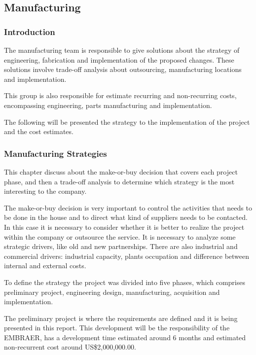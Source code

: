
\subsection{Manufacturing}

\subsubsection{Introduction}

The manufacturing team is responsible to give solutions about the strategy of engineering, fabrication and implementation of the proposed changes. These solutions involve trade-off analysis about outsourcing, manufacturing 
locations and implementation. 

This group is also responsible for estimate recurring and non-recurring costs, encompassing engineering, parts manufacturing and implementation.

The following will be presented the strategy to the implementation of the project and the cost estimates.

\subsubsection{Manufacturing Strategies}

This chapter discuss about the make-or-buy decision that covers each project phase, and then a trade-off analysis to determine which strategy is the most interesting to the company.

The make-or-buy decision is very important to control the activities that needs to be done in the house and to direct what kind of suppliers needs to be contacted. In this case it is necessary to consider whether it is 
better to realize the project within the company or outsource the service. It is necessary to analyze some strategic drivers, like old and new partnerships. There are also industrial and commercial drivers: industrial 
capacity, plants occupation and difference between internal and external costs.

To define the strategy the project was divided into five phases, which comprises preliminary project, engineering design, manufacturing, acquisition and implementation. 

The preliminary project is where the requirements are defined and it is being presented in this report. This development will be the responsibility of the EMBRAER, has a development time estimated around 6 months and estimated 
non-recurrent cost around US\$2,000,000.00.

